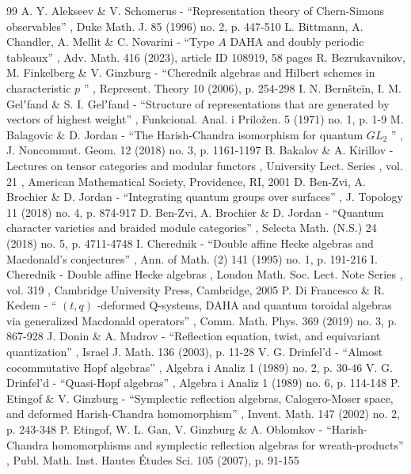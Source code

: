 \documentclass[11pt]{article}
\theoremstyle{definition}
\begin{document}
\begin{thebibliography}{99}
 A. Y. Alekseev \& V. Schomerus - “Representation theory of Chern-Simons observables” , Duke Math. J. 85 (1996) no. 2, p. 447-510
 L. Bittmann, A. Chandler, A. Mellit \& C. Novarini - “Type $A$ DAHA and doubly periodic tableaux” , Adv. Math. 416 (2023), article ID 108919, 58 pages
 R. Bezrukavnikov, M. Finkelberg \& V. Ginzburg - “Cherednik algebras and Hilbert schemes in characteristic $p$ ” , Represent. Theory 10 (2006), p. 254-298
 I. N. Bernšteĭn, I. M. Gelʼfand \& S. I. Gelʼfand - “Structure of representations that are generated by vectors of highest weight” , Funkcional. Anal. i Priložen. 5 (1971) no. 1, p. 1-9
 M. Balagovic \& D. Jordan - “The Harish-Chandra isomorphism for quantum $GL_2$ ” , J. Noncommut. Geom. 12 (2018) no. 3, p. 1161-1197
 B. Bakalov \& A. Kirillov - Lectures on tensor categories and modular functors , University Lect. Series , vol. 21 , American Mathematical Society, Providence, RI, 2001
 D. Ben-Zvi, A. Brochier \& D. Jordan - “Integrating quantum groups over surfaces” , J. Topology 11 (2018) no. 4, p. 874-917
 D. Ben-Zvi, A. Brochier \& D. Jordan - “Quantum character varieties and braided module categories” , Selecta Math. (N.S.) 24 (2018) no. 5, p. 4711-4748
 I. Cherednik - “Double affine Hecke algebras and Macdonald’s conjectures” , Ann. of Math. (2) 141 (1995) no. 1, p. 191-216
 I. Cherednik - Double affine Hecke algebras , London Math. Soc. Lect. Note Series , vol. 319 , Cambridge University Press, Cambridge, 2005
 P. Di Francesco \& R. Kedem - “ $(t,q)$ -deformed Q-systems, DAHA and quantum toroidal algebras via generalized Macdonald operators” , Comm. Math. Phys. 369 (2019) no. 3, p. 867-928
 J. Donin \& A. Mudrov - “Reflection equation, twist, and equivariant quantization” , Israel J. Math. 136 (2003), p. 11-28
 V. G. Drinfel’d - “Almost cocommutative Hopf algebras” , Algebra i Analiz 1 (1989) no. 2, p. 30-46
 V. G. Drinfel’d - “Quasi-Hopf algebras” , Algebra i Analiz 1 (1989) no. 6, p. 114-148
 P. Etingof \& V. Ginzburg - “Symplectic reflection algebras, Calogero-Moser space, and deformed Harish-Chandra homomorphism” , Invent. Math. 147 (2002) no. 2, p. 243-348
 P. Etingof, W. L. Gan, V. Ginzburg \& A. Oblomkov - “Harish-Chandra homomorphisms and symplectic reflection algebras for wreath-products” , Publ. Math. Inst. Hautes Études Sci. 105 (2007), p. 91-155

\end{thebibliography}
\end{document}
